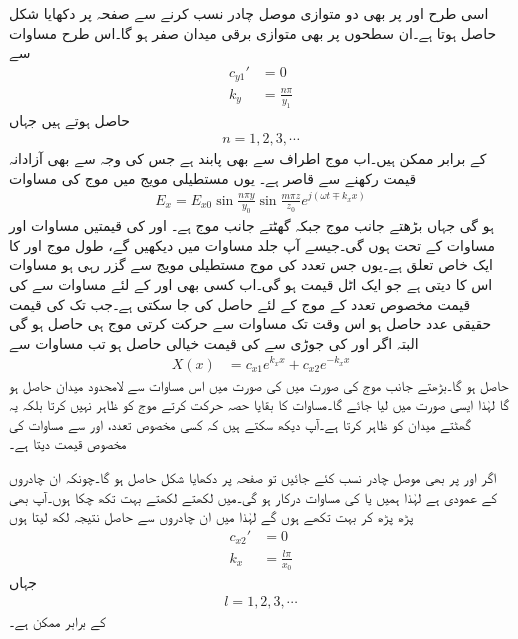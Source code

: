 اسی طرح  اور  پر بھی دو متوازی موصل چادر نسب کرنے سے صفحہ  پر دکھایا شکل  حاصل ہوتا ہے۔ان سطحوں پر بھی متوازی برقی میدان صفر ہو گا۔اس طرح مساوات  سے
\begin{align}
c_{y1}'&=0\\
k_y &=\frac{n \pi}{y_1}\label{مساوات_مویج_میکس_ویل_عمومی_مستطیلی_شرط_ب}
\end{align}
حاصل ہوتے ہیں جہاں
\begin{align}
n=1,2,3,\cdots
\end{align}
کے برابر ممکن ہیں۔اب موج  اطراف سے بھی  پابند ہے جس کی وجہ سے  بھی آزادانہ قیمت رکھنے سے قاصر ہے۔ یوں مستطیلی مویج میں موج کی مساوات 
\begin{align}
E_x=E_{x0} \sin \frac{n\pi y}{y_0} \sin \frac{m\pi z}{z_0} e^{j(\omega t \mp k_x x)}
\end{align}
ہو گی جہاں  بڑھتے  جانب موج جبکہ  گھٹتے  جانب موج ہے۔  اور  کی قیمتیں مساوات  اور مساوات  کے تحت ہوں گی۔جیسے آپ جلد مساوات  میں دیکھیں گے، طول موج اور  کا ایک خاص تعلق ہے۔یوں جس تعدد کی موج مستطیلی مویج سے گزر رہی ہو مساوات  اس کا  دیتی ہے جو ایک  اٹل قیمت ہو گی۔اب کسی بھی  اور  کے لئے مساوات  سے  کی قیمت مخصوص تعدد کے موج کے لئے حاصل کی جا سکتی ہے۔جب تک  کی قیمت حقیقی عدد حاصل ہو اس وقت تک مساوات  سے  حرکت کرتی موج ہی حاصل ہو گی البتہ اگر   اور  کی جوڑی سے  کی قیمت خیالی حاصل ہو تب مساوات    سے
\begin{align*}
X(x)&=c_{x1}e^{k_x x}+c_{x2}e^{ - k_x x} 
\end{align*}
حاصل ہو گا۔بڑھتے  جانب موج  کی صورت میں  کی صورت میں اس مساوات سے لامحدود میدان حاصل ہو گا لہٰذا ایسی صورت میں  لیا جائے گا۔مساوات کا بقایا حصہ حرکت کرتے موج کو ظاہر نہیں کرتا بلکہ یہ گھٹتے میدان کو ظاہر کرتا ہے۔آپ دیکھ سکتے ہیں کہ کسی مخصوص تعدد،  اور 
 سے مساوات   کی مخصوص قیمت دیتا ہے۔ 

اگر  اور  پر بھی موصل چادر نسب کئے جائیں تو صفحہ  پر دکھایا شکل  حاصل ہو گا۔چونکہ  ان چادروں کے عمودی ہے لہٰذا ہمیں  یا  کی مساوات درکار ہو گی۔میں لکھتے لکھتے بہت تکھ  چکا ہوں۔آپ بھی پڑھ پڑھ کر بہت تکھے ہوں گے لہٰذا میں ان چادروں سے حاصل نتیجہ لکھ لیتا ہوں
\begin{align}
c_{x2}'&=0\\
k_x&=\frac{l\pi}{x_0}
\end{align} 
جہاں
\begin{align}
l=1,2,3,\cdots
\end{align}
کے برابر ممکن ہے۔

